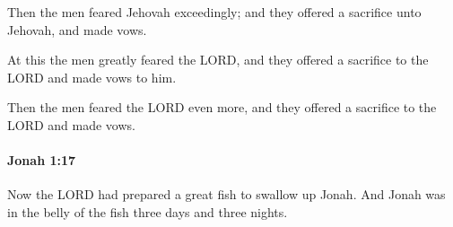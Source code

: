 			\begin{versebox}
					\item[BHS] 
					\item[LXX] 
					\item[ASV] Then the men feared Jehovah exceedingly; and they offered a sacrifice unto Jehovah, and made vows.
					\item[NIV] At this the men greatly feared the LORD, and they offered a sacrifice to the LORD and made vows to him.
					\item[NRSV] Then the men feared the LORD even more, and they offered a sacrifice to the LORD and made vows.
			\end{versebox}

		\paragraph{Jonah 1:17} %
			\label{JONAH-1-17}

			Now the LORD had prepared a great fish to swallow up Jonah. And Jonah was in the belly of the fish three days and three nights.

